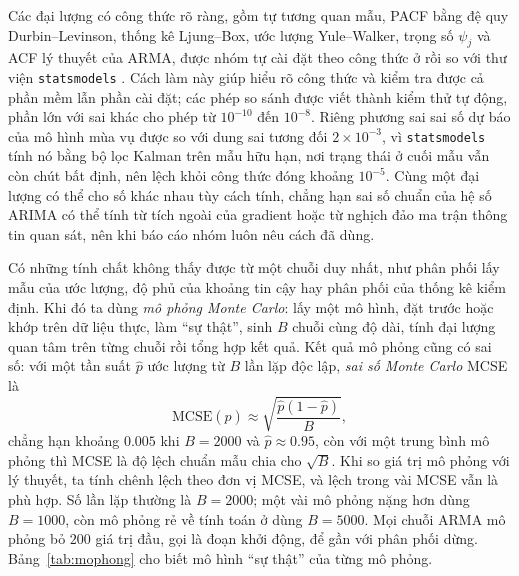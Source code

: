 Các đại lượng có công thức rõ ràng, gồm tự tương quan mẫu, PACF bằng đệ quy Durbin--Levinson, thống kê Ljung--Box, ước lượng Yule--Walker, trọng số $\psi_j$ và ACF lý thuyết của ARMA, được nhóm tự cài đặt theo công thức ở  rồi so với thư viện \texttt{statsmodels} . Cách làm này giúp hiểu rõ công thức và kiểm tra được cả phần mềm lẫn phần cài đặt; các phép so sánh được viết thành kiểm thử tự động, phần lớn với sai khác cho phép từ $10^{-10}$ đến $10^{-8}$. Riêng phương sai sai số dự báo của mô hình mùa vụ được so với dung sai tương đối $2\times10^{-3}$, vì \texttt{statsmodels} tính nó bằng bộ lọc Kalman trên mẫu hữu hạn, nơi trạng thái ở cuối mẫu vẫn còn chút bất định, nên lệch khỏi công thức đóng khoảng $10^{-5}$. Cùng một đại lượng có thể cho số khác nhau tùy cách tính, chẳng hạn sai số chuẩn của hệ số ARIMA có thể tính từ tích ngoài của gradient hoặc từ nghịch đảo ma trận thông tin quan sát, nên khi báo cáo nhóm luôn nêu cách đã dùng.

Có những tính chất không thấy được từ một chuỗi duy nhất, như phân phối lấy mẫu của ước lượng, độ phủ của khoảng tin cậy hay phân phối của thống kê kiểm định. Khi đó ta dùng \emph{mô phỏng Monte Carlo}: lấy một mô hình, đặt trước hoặc khớp trên dữ liệu thực, làm ``sự thật'', sinh $B$ chuỗi cùng độ dài, tính đại lượng quan tâm trên từng chuỗi rồi tổng hợp kết quả. Kết quả mô phỏng cũng có sai số: với một tần suất $\hat p$ ước lượng từ $B$ lần lặp độc lập, \emph{sai số Monte Carlo} MCSE là
\[
\mathrm{MCSE}(\hat p)\approx\sqrt{\frac{\hat p(1-\hat p)}{B}},
\]
chẳng hạn khoảng $0.005$ khi $B=2000$ và $\hat p\approx0.95$, còn với một trung bình mô phỏng thì MCSE là độ lệch chuẩn mẫu chia cho $\sqrt B$. Khi so giá trị mô phỏng với lý thuyết, ta tính chênh lệch theo đơn vị MCSE, và lệch trong vài MCSE vẫn là phù hợp. Số lần lặp thường là $B=2000$; một vài mô phỏng nặng hơn dùng $B=1000$, còn mô phỏng rẻ về tính toán ở  dùng $B=5000$. Mọi chuỗi ARMA mô phỏng bỏ $200$ giá trị đầu, gọi là đoạn khởi động, để gần với phân phối dừng. Bảng~\ref{tab:mophong} cho biết mô hình ``sự thật'' của từng mô phỏng.

